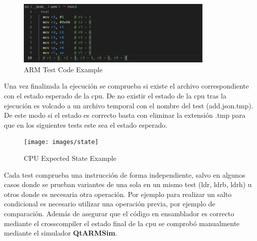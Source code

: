 {        \begin{figure}[h]
         \centering
            \includegraphics[width=0.85\textwidth]{images/asm}
            \caption{ARM Test Code Example}
        \end{figure}

        \newpage
        Una vez finalizada la ejecución se comprueba si existe el archivo correspondiente con el estado esperado de la cpu.
        De no existir el estado de la cpu tras la ejecución es volcado a un archivo temporal con el nombre del test (add.json.tmp).
        De este modo si el estado es correcto basta con eliminar la extensión .tmp para que en los siguientes tests este sea el estado esperado.
    
        \begin{figure}[h]
         \centering
            \texttt{[image: images/state]}
            \caption{CPU Expected State Example}
        \end{figure}
        
        Cada test comprueba una instrucción de forma independiente, salvo en algunos casos donde se prueban variantes de una sola en un mismo test (ldr, ldrb, ldrh) u otros
        donde es necesaria otra operación. Por ejemplo para realizar un salto condicional es necesario utilizar una operación previa, por ejemplo de comparación.
        Además de asegurar que el código en ensamblador es correcto mediante el crosscompiler el estado final
        de la cpu se comprobó manualmente mediante el simulador \textbf{QtARMSim}.        
    }
    
